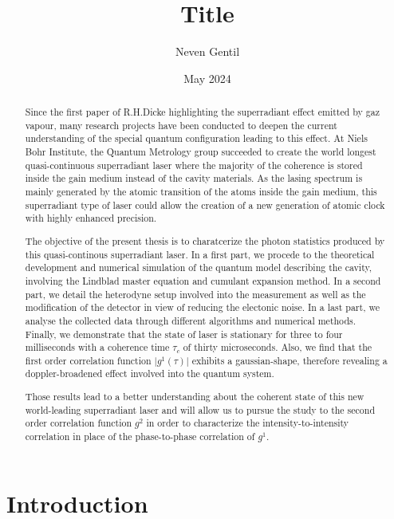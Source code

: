 \documentclass[11pt]{report}
\begin{document}
\title{Title}
\author{Neven Gentil}
\date{May 2024}
\maketitle

\begin{abstract}
Since the first paper of R.H.Dicke highlighting the superradiant effect emitted by gaz vapour, many research projects have been conducted to deepen the current understanding of the special quantum configuration leading to this effect. At Niels Bohr Institute, the Quantum Metrology group succeeded to create the world longest quasi-continuous superradiant laser where the majority of the coherence is stored inside the gain medium instead of the cavity materials. As the lasing spectrum is mainly generated by the atomic transition of the atoms inside the gain medium, this superradiant type of laser could allow the creation of a new generation of atomic clock with highly enhanced precision. 

The objective of the present thesis is to charatcerize the photon statistics produced by this quasi-continous superradiant laser. In a first part, we procede to the theoretical development and numerical simulation of the quantum model describing the cavity, involving the Lindblad master equation and cumulant expansion method. In a second part, we detail the heterodyne setup involved into the measurement as well as the modification of the detector in view of reducing the electonic noise. In a last part, we analyse the collected data through different algorithms and numerical methods. Finally, we demonstrate that the state of laser is stationary for three to four milliseconds with a coherence time $\tau_c$ of thirty microseconds. Also, we find that the first order correlation function $\vert g^1(\tau) \vert$ exhibits a gaussian-shape, therefore revealing a doppler-broadened effect involved into the quantum system.

Those results lead to a better understanding about the coherent state of this new world-leading superradiant laser and will allow us to pursue the study to the second order correlation function $g^2$ in order to characterize the intensity-to-intensity correlation in place of the phase-to-phase correlation of $g^1$.
\end{abstract}

\chapter{Introduction}
\end{document}
